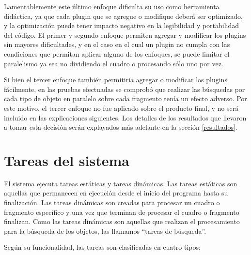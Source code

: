 Lamentablemente este último enfoque dificulta su uso como herramienta didáctica,
ya que cada plugin que se agregue o modifique deberá ser optimizado, y la
optimización puede tener impacto negativo en la legibilidad y portabilidad del
código. El primer y segundo enfoque permiten agregar y modificar los plugins sin
mayores dificultades, y en el caso en el cual un plugin no cumpla con las
condiciones que permitan aplicar alguno de los enfoques, se puede limitar el
paralelismo ya sea no dividiendo el cuadro o procesando sólo uno por vez.

Si bien el tercer enfoque también permitiría agregar o modificar los plugins
fácilmente, en las pruebas efectuadas se comprobó que realizar las búsquedas por
cada tipo de objeto en paralelo sobre cada fragmento tenía un efecto adverso.
Por este motivo, el tercer enfoque no fue aplicado sobre el producto final, y no
será incluido en las explicaciones siguientes. Los detalles de los resultados
que llevaron a tomar esta decisión serán explayados más adelante en la sección
\ref{resultados}.

\section{Tareas del sistema}

El sistema ejecuta tareas estáticas y tareas dinámicas. Las tareas estáticas son
aquellas que permanecen en ejecución desde el inicio del programa hasta su
finalización. Las tareas dinámicas son creadas para procesar un cuadro o
fragmento específico y una vez que terminan de procesar el cuadro o fragmento
finalizan. Como las tareas dinámicas son aquellas que realizan el procesamiento
para la búsqueda de los objetos, las llamamos ``tareas de búsqueda''.

Según su funcionalidad, las tareas son clasificadas en cuatro tipos:

